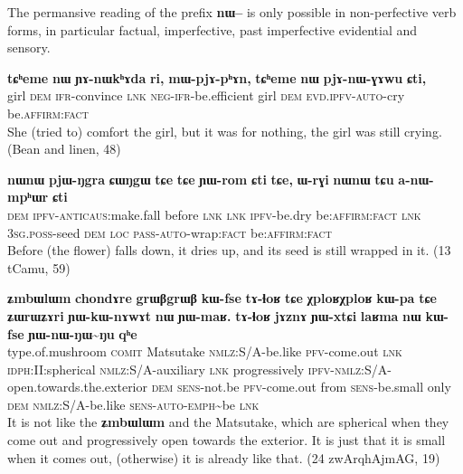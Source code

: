 \documentclass[oldfontcommands,oneside,a4paper,11pt]{article}
\newcommand{\ipa}[1]{\textbf{{\phon\mbox{#1}}}} %
\begin{document}
The permansive reading of the prefix \ipa{nɯ--} is only possible in non-perfective verb forms, in particular factual, imperfective, past imperfective evidential and sensory.


\begin{exe}
\ex \label{ex:pjAnWGAwu}
\gll
\ipa{tɕʰeme} 	\ipa{nɯ} 	\ipa{ɲɤ-nɯkʰɤda} 	\ipa{ri,} 	\ipa{mɯ-pjɤ-pʰɤn,} 	\ipa{tɕʰeme} 	\ipa{nɯ} 	\ipa{pjɤ-nɯ-ɣɤwu} 	\ipa{ɕti,} \\
girl \textsc{dem} \textsc{ifr}-convince \textsc{lnk} \textsc{neg-ifr}-be.efficient girl \textsc{dem} \textsc{evd.ipfv-auto}-cry  be.\textsc{affirm:fact} \\
\glt She (tried to) comfort the girl, but it was for nothing, the girl was still crying. (Bean and linen, 48)
\end{exe} 

\begin{exe}
\ex \label{ex:anWmphWr}
\gll
\ipa{nɯnɯ} 	\ipa{pjɯ-ŋgra} 	\ipa{ɕɯŋgɯ} 	\ipa{tɕe} 	\ipa{tɕe} 	\ipa{ɲɯ-rom} 	\ipa{ɕti} 	\ipa{tɕe,} 	\ipa{ɯ-rɣi} 	\ipa{nɯnɯ} 	\ipa{tɕu} 	\ipa{a-nɯ-mpʰɯr} 	\ipa{ɕti} \\
\textsc{dem} \textsc{ipfv-anticaus}:make.fall before \textsc{lnk}  \textsc{lnk} \textsc{ipfv}-be.dry be\textsc{:affirm:fact} \textsc{lnk} \textsc{3sg.poss}-seed \textsc{dem} \textsc{loc} \textsc{pass-auto}-wrap:\textsc{fact} be\textsc{:affirm:fact} \\
\glt Before (the flower) falls down, it dries up, and its seed is still wrapped in it. (13 tCamu, 59)
\end{exe} 


\begin{exe}
 \ex \label{ex:YWnWNWNu}
 \gll
\ipa{ʑmbɯlɯm}	\ipa{chondɤre}  	\ipa{grɯβgrɯβ}  	\ipa{kɯ-fse}  	\ipa{tɤ-ɬoʁ}  	\ipa{tɕe}  	\ipa{χploʁχploʁ}  	\ipa{kɯ-pa}  
\ipa{tɕe}  	\ipa{ʑɯrɯʑɤri}  	\ipa{ɲɯ-kɯ-nɤwɤt}  	\ipa{nɯ}  	\ipa{ɲɯ-maʁ.}  
\ipa{tɤ-ɬoʁ}  	\ipa{jɤznɤ}  	\ipa{ɲɯ-xtɕi}  	\ipa{laʁma}  	\ipa{nɯ}  	\ipa{kɯ-fse}  	\ipa{ɲɯ-nɯ-ŋɯ\textasciitilde{}ŋu}  	\ipa{qʰe}  	\\
type.of.mushroom \textsc{comit} Matsutake \textsc{nmlz}:S/A-be.like \textsc{pfv}-come.out \textsc{lnk} \textsc{idph:II:}spherical \textsc{nmlz}:S/A-auxiliary \textsc{lnk} progressively \textsc{ipfv}-\textsc{nmlz}:S/A-open.towards.the.exterior \textsc{dem} \textsc{sens}-not.be  \textsc{pfv}-come.out from \textsc{sens}-be.small only \textsc{dem} \textsc{nmlz}:S/A-be.like \textsc{sens-auto}-\textsc{emph}\textasciitilde{}be \textsc{lnk} \\
\glt It is not like the \ipa{ʑmbɯlɯm} and the Matsutake, which are spherical when they come out and progressively open towards the exterior. It is just that it is small when it comes out, (otherwise) it is already like that.
 (24 zwArqhAjmAG, 19)
 \end{exe}
\end{document}
